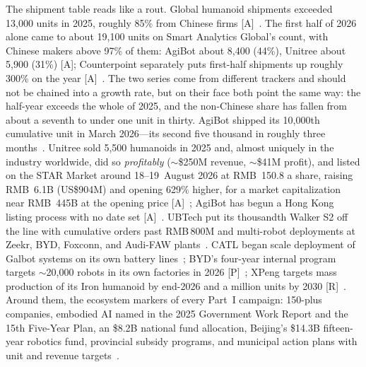 The shipment table reads like a rout. Global humanoid shipments exceeded 13{,}000 units in 2025, roughly 85\% from Chinese firms [A]~\cite{fortune-humanoid}. The first half of 2026 alone came to about 19{,}100 units on Smart Analytics Global's count, with Chinese makers above 97\% of them: AgiBot about 8{,}400 (44\%), Unitree about 5{,}900 (31\%) [A]; Counterpoint separately puts first-half shipments up roughly 300\% on the year [A]~\cite{hw-humanoid-h1}. The two series come from different trackers and should not be chained into a growth rate, but on their face both point the same way: the half-year exceeds the whole of 2025, and the non-Chinese share has fallen from about a seventh to under one unit in thirty. AgiBot shipped its 10{,}000th cumulative unit in March 2026---its second five thousand in roughly three months~\cite{agibot-10k}. Unitree sold 5{,}500 humanoids in 2025 and, almost uniquely in the industry worldwide, did so \emph{profitably} ($\sim$\$250M revenue, $\sim$\$41M profit), and listed on the STAR Market around 18--19~August 2026 at RMB~150.8 a share, raising RMB~6.1B (US\$904M) and opening 629\% higher, for a market capitalization near RMB~445B at the opening price [A]~\cite{unitree-ipo,hw-unitree-listing}; AgiBot has begun a Hong Kong listing process with no date set [A]~\cite{hw-unitree-listing}. UBTech put its thousandth Walker S2 off the line with cumulative orders past RMB\,800M and multi-robot deployments at Zeekr, BYD, Foxconn, and Audi-FAW plants~\cite{ubtech}. CATL began scale deployment of Galbot systems on its own battery lines~\cite{catl-galbot}; BYD's four-year internal program targets $\sim$20{,}000 robots in its own factories in 2026 [P]~\cite{byd-robots}; XPeng targets mass production of its Iron humanoid by end-2026 and a million units by 2030 [R]~\cite{xpeng-iron}. Around them, the ecosystem markers of every Part~I campaign: 150-plus companies, embodied AI named in the 2025 Government Work Report and the 15th Five-Year Plan, an \$8.2B national fund allocation, Beijing's \$14.3B fifteen-year robotics fund, provincial subsidy programs, and municipal action plans with unit and revenue targets~\cite{miit-humanoid,embodied-policy}.

